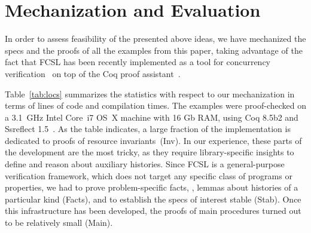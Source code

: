 
\section{Mechanization and Evaluation}
\label{sec:evaluation}

%

In order to assess feasibility of the presented above ideas, we have
mechanized the specs and the proofs of all the examples from this
paper, taking advantage of the fact that FCSL has been recently
implemented as a tool for concurrency
verification~\cite{Sergey-al:PLDI15} on top of the Coq proof
assistant~\cite{Coq-manual}.

Table~\ref{tab:locs} summarizes the statistics with respect to our
mechanization in terms of lines of code and compilation times. 
%
The examples were proof-checked on a 3.1~GHz Intel Core~i7 OS~X
machine with 16 Gb RAM, using Coq 8.5b2 and Ssreflect
1.5~\cite{Gonthier-al:TR}.
%
As the table indicates, a large fraction of the implementation is
dedicated to proofs of resource invariants~(\textsf{Inv}).
%
In our experience, these parts of the development are the most tricky,
as they require library-specific insights to define and reason about
auxiliary histories.
%
Since FCSL is a general-purpose verification framework, which does not
target any specific class of programs or properties, we had to prove
problem-specific facts, \eg, lemmas about histories of a particular
kind (\textsf{Facts}), and to establish the specs of interest stable
(\textsf{Stab}). Once this infrastructure has been developed, the
proofs of main procedures turned out to be relatively small
(\textsf{Main}).
%
%

